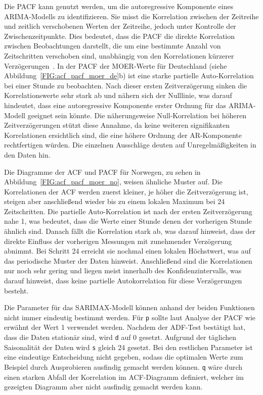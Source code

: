 Die \ac{PACF} kann genutzt werden, um die autoregressive Komponente eines \ac{ARIMA}-Modells zu identifizieren.
Sie misst die Korrelation zwischen der Zeitreihe und zeitlich verschobenen Werten der Zeitreihe, jedoch unter Kontrolle der Zwischenzeitpunkte.
Dies bedeutet, dass die \ac{PACF} die direkte Korrelation zwischen Beobachtungen darstellt, die um eine bestimmte Anzahl von Zeitschritten verschoben sind, unabhängig von den Korrelationen kürzerer Verzögerungen~\cite{Peixeiro.2022}.
In der \ac{PACF} der \ac{MOER}-Werte für Deutschland (siehe Abbildung~\ref{FIG:acf_pacf_moer_de}b) ist eine starke partielle Auto-Korrelation bei einer Stunde zu beobachten.
Nach dieser ersten Zeitverzögerung sinken die Korrelationswerte sehr stark ab und nähern sich der Nulllinie, was darauf hindeutet, dass eine autoregressive Komponente erster Ordnung für das \ac{ARIMA}-Modell geeignet sein könnte.
Die näherungsweise Null-Korrelation bei höheren Zeitverzögerungen stützt diese Annahme, da keine weiteren signifikanten Korrelationen ersichtlich sind, die eine höhere Ordnung der AR-Komponente rechtfertigen würden.
Die einzelnen Ausschläge deuten auf Unregelmäßigkeiten in den Daten hin.

Die Diagramme der \ac{ACF} und \ac{PACF} für Norwegen, zu sehen in Abbildung~\ref{FIG:acf_pacf_moer_no}, weisen ähnliche Muster auf.
Die Korrelationen der \ac{ACF} werden zuerst kleiner, je höher die Zeitverzögerung ist, steigen aber anschließend wieder bis zu einem lokalen Maximum bei 24 Zeitschritten.
Die partielle Auto-Korrelation ist nach der ersten Zeitverzögerung nahe 1, was bedeutet, dass die Werte einer Stunde denen der vorherigen Stunde ähnlich sind.
Danach fällt die Korrelation stark ab, was darauf hinweist, dass der direkte Einfluss der vorherigen Messungen mit zunehmender Verzögerung abnimmt.
Bei Schritt 24 erreicht sie nochmal einen lokalen Höchstwert, was auf das periodische Muster der Daten hinweist.
Anschließend sind die Korrelationen nur noch sehr gering und liegen meist innerhalb des Konfidenzintervalls, was darauf hinweist, dass keine partielle Autokorrelation für diese Verzögerungen besteht.

Die Parameter für das SARIMAX-Modell können anhand der beiden Funktionen nicht immer eindeutig bestimmt werden.
Für \lstinline[columns=fixed]{p} sollte laut Analyse der \ac{PACF} wie erwähnt der Wert 1 verwendet werden.
Nachdem der \ac{ADF}-Test bestätigt hat, dass die Daten stationär sind, wird \lstinline[columns=fixed]{d} auf 0 gesetzt.
Aufgrund der täglichen Saisonalität der Daten wird \lstinline[columns=fixed]{s} gleich 24 gesetzt.
Bei den restlichen Parameter ist eine eindeutige Entscheidung nicht gegeben, sodass die optimalen Werte zum Beispiel durch Ausprobieren ausfindig gemacht werden können.
\lstinline[columns=fixed]{q} wäre durch einen starken Abfall der Korrelation im \ac{ACF}-Diagramm definiert, welcher im gezeigten Diagramm aber nicht ausfindig gemacht werden kann.

